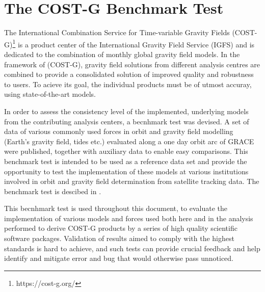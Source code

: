 \section{The COST-G Benchmark Test}\label{sec:costg-benchmark-test}

The International Combination Service for Time-variable Gravity Fields (COST-G)\footnote{https://cost-g.org/} 
is a product center of the International Gravity Field Service (IGFS) and is dedicated 
to the combination of monthly global gravity field models. In the framework of 
(COST-G), gravity field solutions from different analysis centres are combined to 
provide a consolidated solution of improved quality and robustness to users. To 
acieve its goal, the individual products must be of utmost accuray, using 
state-of-the-art models. 

In order to assess the consistency level of the implemented, underlying models 
from the contributing analysis centers, a becnhmark test was devised. A set of 
data of various commonly used forces in orbit and gravity field modelling (Earth's gravity field, tides etc.) evaluated along a one day orbit arc of GRACE were published, together with auxiliary data to enable easy comparisons. This benchmark test is intended to be used as a reference data set and provide the opportunity to test the 
implementation of these models at various institutions involved in orbit and 
gravity field determination from satellite tracking data. The benchmark test is 
descibed in \cite{Lasser2020}.

This becnhmark test is used throughout this document, to evaluate the implementation 
of various models and forces used both here and in the analysis performed to 
derive COST-G products by a series of high quality scientific software packages. Validation of results aimed to comply with the highest standards is hard to achieve, and such 
tests can provide crucial feedback and help identify and mitigate error and bug that would otherwise pass unnoticed.
